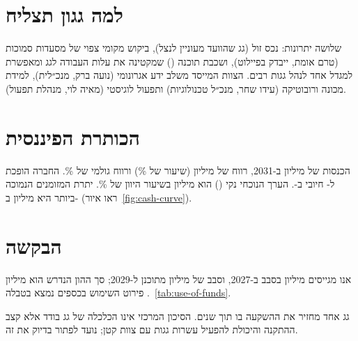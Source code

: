 \section*{למה גגון תצליח}
שלושה יתרונות: נכס זול (גג שהוועד מעוניין לנצל), ביקוש מקומי צפוי של מסעדות סמוכות (טרם אומת, ייבדק בפיילוט), ושכבת תוכנה () שמקטינה את עלות העבודה לגג ומאפשרת למגדל אחד לנהל גגות רבים. הצוות המייסד משלב ידע אגרונומי (נועה ברק, מנכ״לית), למידת מכונה ורובוטיקה (עידו שחר, מנכ״ל טכנולוגיות) ותפעול לוגיסטי (מאיה לוי, מנהלת תפעול).

\section*{הכותרת הפיננסית}
הכנסות של \RRrevFinal{} מיליון \shekel{} ב-2031, רווח  של \RRebitdaFinal{} מיליון \shekel{} (שיעור של \RRebitdaMarginFinal\%) ורווח גולמי של \RRgrossMarginFinal\%. החברה הופכת ל- חיובי ב-\RRbreakEvenYear. הערך הנוכחי נקי () הוא \RRnpv{} מיליון \shekel{} בשיעור היוון של \RRdiscount\%. יתרת המזומנים הנמוכה ביותר היא \RRminCash{} מיליון \shekel{} ב-\RRminCashYear{} (ראו איור~\ref{fig:cash-curve}).

\section*{הבקשה}
אנו מגייסים \RRseed{} מיליון \shekel{} בסבב  ב-2027, וסבב  של \RRseriesA{} מיליון \shekel{} מתוכנן ל-2029; סך ההון הנדרש הוא \RRequityTotal{} מיליון \shekel. פירוט השימוש בכספים נמצא בטבלה~\ref{tab:use-of-funds}.

\begin{insightbox}
גג אחד מחזיר את ההשקעה בו תוך \RRroofPayback{} שנים. הסיכון המרכזי אינו הכלכלה של גג בודד אלא קצב ההתקנה והיכולת להפעיל עשרות גגות עם צוות קטן;  נועד לפתור בדיוק את זה.
\end{insightbox}
